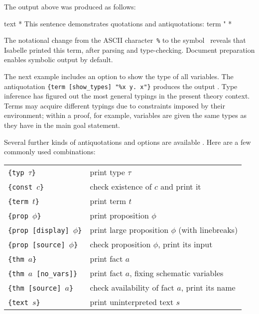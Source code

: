 \begin{isabellebody}
\begin{isamarkuptext}
  \medskip\noindent The output above was produced as follows:
  \begin{ttbox}
text {\ttlbrace}*
  This sentence demonstrates quotations and antiquotations:
  {\at}{\ttlbrace}term "%
*{\ttrbrace}
  \end{ttbox}\vspace{-\medskipamount}

  The notational change from the ASCII character~\verb,%, to the
  symbol~\isa{{\isasymlambda}} reveals that Isabelle printed this term, after
  parsing and type-checking.  Document preparation enables symbolic
  output by default.

  \medskip The next example includes an option to show the type of all
  variables.  The antiquotation
  \texttt{{\at}}\verb,{term [show_types] "%x y. x"}, produces the
  output .  Type inference has figured
  out the most general typings in the present theory context.  Terms
  may acquire different typings due to constraints imposed by their
  environment; within a proof, for example, variables are given the
  same types as they have in the main goal statement.

  \medskip Several further kinds of antiquotations and options are
  available \cite{isabelle-isar-ref}.  Here are a few commonly used
  combinations:

  \medskip

  \begin{tabular}{ll}
  \texttt{\at}\verb,{typ,~$\tau$\verb,}, & print type $\tau$ \\
  \texttt{\at}\verb,{const,~$c$\verb,}, & check existence of $c$ and print it \\
  \texttt{\at}\verb,{term,~$t$\verb,}, & print term $t$ \\
  \texttt{\at}\verb,{prop,~$\phi$\verb,}, & print proposition $\phi$ \\
  \texttt{\at}\verb,{prop [display],~$\phi$\verb,}, & print large proposition $\phi$ (with linebreaks) \\
  \texttt{\at}\verb,{prop [source],~$\phi$\verb,}, & check proposition $\phi$, print its input \\
  \texttt{\at}\verb,{thm,~$a$\verb,}, & print fact $a$ \\
  \texttt{\at}\verb,{thm,~$a$~\verb,[no_vars]}, & print fact $a$, fixing schematic variables \\
  \texttt{\at}\verb,{thm [source],~$a$\verb,}, & check availability of fact $a$, print its name \\
  \texttt{\at}\verb,{text,~$s$\verb,}, & print uninterpreted text $s$ \\
  \end{tabular}


\end{isamarkuptext}
\end{isabellebody}
